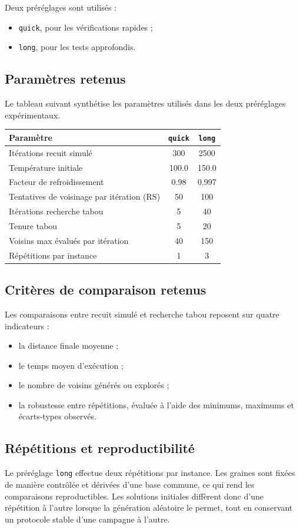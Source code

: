 \documentclass[11pt,a4paper]{article}
\begin{document}
Deux préréglages sont utilisés :
\begin{itemize}
    \item \texttt{quick}, pour les vérifications rapides ;
    \item \texttt{long}, pour les tests approfondis.
\end{itemize}

\subsection{Paramètres retenus}
Le tableau suivant synthétise les paramètres utilisés dans les deux préréglages expérimentaux.

\begin{center}
\begin{tabular}{lcc}
\toprule
Paramètre & \texttt{quick} & \texttt{long} \\
\midrule
Itérations recuit simulé & 300 & 2500 \\
Température initiale & 100.0 & 150.0 \\
Facteur de refroidissement & 0.98 & 0.997 \\
Tentatives de voisinage par itération (RS) & 50 & 100 \\
Itérations recherche tabou & 5 & 40 \\
Tenure tabou & 5 & 20 \\
Voisins max évalués par itération & 40 & 150 \\
Répétitions par instance & 1 & 3 \\
\bottomrule
\end{tabular}
\end{center}

\subsection{Critères de comparaison retenus}
Les comparaisons entre recuit simulé et recherche tabou reposent sur quatre indicateurs :
\begin{itemize}
    \item la distance finale moyenne ;
    \item le temps moyen d'exécution ;
    \item le nombre de voisins générés ou explorés ;
    \item la robustesse entre répétitions, évaluée à l'aide des minimums, maximums et écarts-types observés.
\end{itemize}

\subsection{Répétitions et reproductibilité}
Le préréglage \texttt{long} effectue deux répétitions par instance. Les graines sont fixées de manière contrôlée et dérivées d'une base commune, ce qui rend les comparaisons reproductibles. Les solutions initiales diffèrent donc d'une répétition à l'autre lorsque la génération aléatoire le permet, tout en conservant un protocole stable d'une campagne à l'autre.
\end{document}
